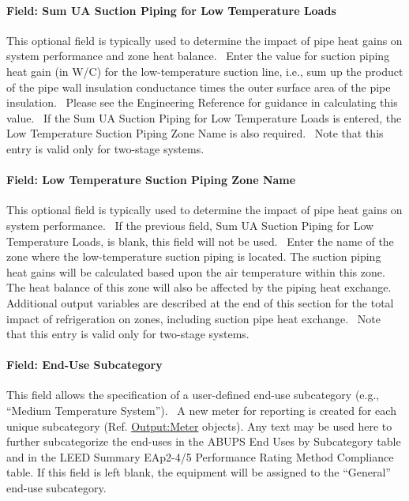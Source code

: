 \paragraph{Field: Sum UA Suction Piping for Low Temperature Loads}\label{field-sum-ua-suction-piping-for-low-temperature-loads}

This optional field is typically used to determine the impact of pipe heat gains on system performance and zone heat balance.~ Enter the value for suction piping heat gain (in W/C) for the low-temperature suction line, i.e., sum up the product of the pipe wall insulation conductance times the outer surface area of the pipe insulation.~ Please see the Engineering Reference for guidance in calculating this value.~ If the Sum UA Suction Piping for Low Temperature Loads is entered, the Low Temperature Suction Piping Zone Name is also required.~ Note that this entry is valid only for two-stage systems.

\paragraph{Field: Low Temperature Suction Piping Zone Name}\label{field-low-temperature-suction-piping-zone-name}

This optional field is typically used to determine the impact of pipe heat gains on system performance.~ If the previous field, Sum UA Suction Piping for Low Temperature Loads, is blank, this field will not be used.~ Enter the name of the zone where the low-temperature suction piping is located. The suction piping heat gains will be calculated based upon the air temperature within this zone.~ The heat balance of this zone will also be affected by the piping heat exchange.~ Additional output variables are described at the end of this section for the total impact of refrigeration on zones, including suction pipe heat exchange.~ Note that this entry is valid only for two-stage systems.

\paragraph{Field: End-Use Subcategory}\label{field-end-use-subcategory-2-002}

This field allows the specification of a user-defined end-use subcategory (e.g., ``Medium Temperature System'').~ A new meter for reporting is created for each unique subcategory (Ref. \hyperref[outputmeter-and-outputmetermeterfileonly]{Output:Meter} objects). Any text may be used here to further subcategorize the end-uses in the ABUPS End Uses by Subcategory table and in the LEED Summary EAp2-4/5 Performance Rating Method Compliance table. If this field is left blank, the equipment will be assigned to the ``General'' end-use subcategory.


